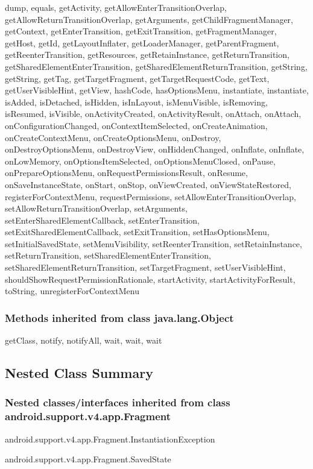 dump, equals, getActivity, getAllowEnterTransitionOverlap, getAllowReturnTransitionOverlap, getArguments, getChildFragmentManager, getContext, getEnterTransition, getExitTransition, getFragmentManager, getHost, getId, getLayoutInflater, getLoaderManager, getParentFragment, getReenterTransition, getResources, getRetainInstance, getReturnTransition, getSharedElementEnterTransition, getSharedElementReturnTransition, getString, getString, getTag, getTargetFragment, getTargetRequestCode, getText, getUserVisibleHint, getView, hashCode, hasOptionsMenu, instantiate, instantiate, isAdded, isDetached, isHidden, isInLayout, isMenuVisible, isRemoving, isResumed, isVisible, onActivityCreated, onActivityResult, onAttach, onAttach, onConfigurationChanged, onContextItemSelected, onCreateAnimation, onCreateContextMenu, onCreateOptionsMenu, onDestroy, onDestroyOptionsMenu, onDestroyView, onHiddenChanged, onInflate, onInflate, onLowMemory, onOptionsItemSelected, onOptionsMenuClosed, onPause, onPrepareOptionsMenu, onRequestPermissionsResult, onResume, onSaveInstanceState, onStart, onStop, onViewCreated, onViewStateRestored, registerForContextMenu, requestPermissions, setAllowEnterTransitionOverlap, setAllowReturnTransitionOverlap, setArguments, setEnterSharedElementCallback, setEnterTransition, setExitSharedElementCallback, setExitTransition, setHasOptionsMenu, setInitialSavedState, setMenuVisibility, setReenterTransition, setRetainInstance, setReturnTransition, setSharedElementEnterTransition, setSharedElementReturnTransition, setTargetFragment, setUserVisibleHint, shouldShowRequestPermissionRationale, startActivity, startActivityForResult, toString, unregisterForContextMenu\\

\subsubsection{Methods inherited from class java.lang.Object}

getClass, notify, notifyAll, wait, wait, wait\\



\subsection{Nested Class Summary}

\subsubsection{Nested classes/interfaces inherited from class android.support.v4.app.Fragment}
\begin{DoxyCompactItemize}
\item android.support.v4.app.Fragment.InstantiationException
\item android.support.v4.app.Fragment.SavedState
\end{DoxyCompactItemize} 



